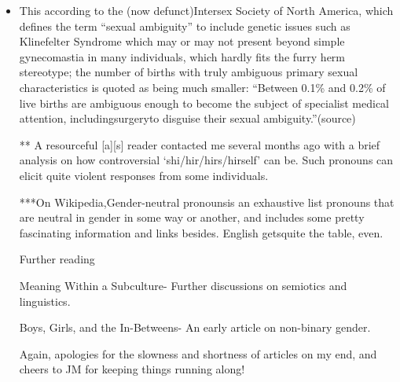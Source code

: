 \begin{itemize}
\tightlist
\item
  This according to the (now defunct)Intersex Society of North America, which defines the term ``sexual ambiguity'' to include genetic issues such as Klinefelter Syndrome which may or may not present beyond simple gynecomastia in many individuals, which hardly fits the furry herm stereotype; the number of births with truly ambiguous primary sexual characteristics is quoted as being much smaller: ``Between 0.1\% and 0.2\% of live births are ambiguous enough to become the subject of specialist medical attention, includingsurgeryto disguise their sexual ambiguity.''(source)

  ** A resourceful {[}a{]}{[}s{]} reader contacted me several months ago with a brief analysis on how controversial `shi/hir/hirs/hirself' can be. Such pronouns can elicit quite violent responses from some individuals.

  ***On Wikipedia,Gender-neutral pronounsis an exhaustive list pronouns that are neutral in gender in some way or another, and includes some pretty fascinating information and links besides. English getsquite the table, even.

  Further reading

  Meaning Within a Subculture- Further discussions on semiotics and linguistics.

  Boys, Girls, and the In-Betweens- An early article on non-binary gender.

  Again, apologies for the slowness and shortness of articles on my end, and cheers to JM for keeping things running along!
\end{itemize}
